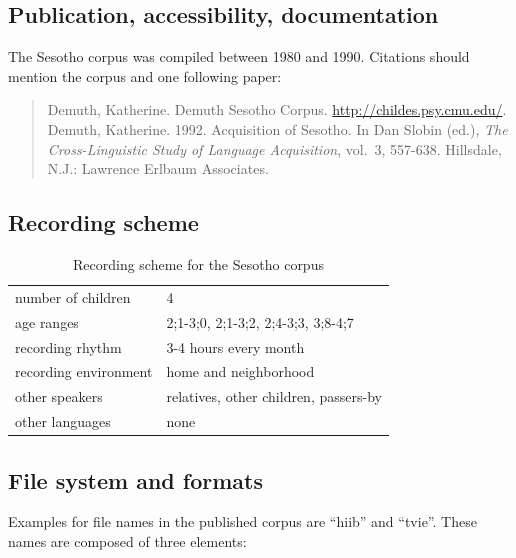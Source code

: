 \documentclass[a4paper, 11pt]{book}
\begin{document}
\subsection{Publication, accessibility, documentation}

The Sesotho corpus \citep{Demuth1992b, Demuth2015a} was compiled between 1980 and 1990. Citations should mention the corpus and one following paper: 

\begin{quote}
	Demuth, Katherine. Demuth Sesotho Corpus. \href{http://childes.talkbank.org/access/Other/Sesotho/Demuth.html}{http://childes.psy.cmu.edu/}. \\
	Demuth, Katherine. 1992. Acquisition of Sesotho. In Dan Slobin (ed.), \emph{The Cross-Linguistic Study of Language Acquisition}, vol.\ 3, 557-638. Hillsdale, N.J.: Lawrence Erlbaum Associates.
\end{quote}

\subsection{Recording scheme}

\begin{table}[ht]
	\centering
	\begin{tabular}{ll}
		\toprule
		number of children 	& 4 \\
		age ranges 			& 2;1-3;0, 2;1-3;2, 2;4-3;3, 3;8-4;7 \\
		recording rhythm 	& 3-4 hours every month \\
		recording environment & home and neighborhood \\
		other speakers 		& relatives, other children, passers-by \\
		other languages		& none \\
		\bottomrule
	\end{tabular}
	\caption{Recording scheme for the Sesotho corpus}
	\label{tab:Sesotho recording scheme}
\end{table}

\subsection{File system and formats}

Examples for file names in the published corpus are “hiib” and “tvie”. These names are composed of three elements: 
\end{document}

